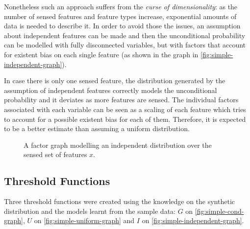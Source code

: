 Nonetheless such an approach suffers from
the \emph{curse of dimensionality}: as the number of sensed features and feature
types increase, exponential amounts of data is needed to describe it.
In order to avoid those the issues, an assumption about independent features can be made
and then the unconditional probability can be modelled with fully disconnected variables, 
but with factors that account for existent bias on each single feature (as shown in
the graph in \autoref{fig:simple-independent-graph}).

In case there is only one sensed feature, the distribution generated by the
assumption of independent features correctly models the unconditional
probability and it deviates as more features are sensed.
The individual factors associated with each variable can be seen as a scaling of
each feature which tries to account for a possible existent bias for each
of them. Therefore, it is expected to be a better estimate than assuming a uniform distribution.

\begin{figure}[h]
\centering
{}
\caption{\label{fig:simple-independent-graph}A factor graph modelling an
         independent distribution over the sensed set of features $x$.}
\end{figure}



\subsection{Threshold Functions}
Three threshold functions were created using the knowledge on the synthetic
distribution and the models learnt from the sample data:
$G$ on \autoref{fig:simple-cond-graph},
$U$ on \autoref{fig:simple-uniform-graph} and
$I$ on \autoref{fig:simple-independent-graph}.

